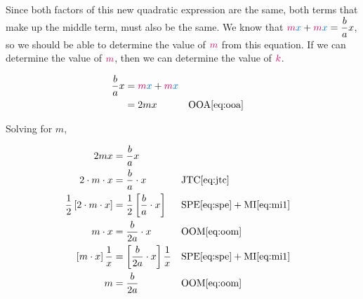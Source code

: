 Since both factors of this new quadratic expression are the same, both terms that make up the middle term,  must also be the same.  We know that ${\color{sthlmRed}m}{\color{sthlmBlue}x} + {\color{sthlmRed}m}{\color{sthlmBlue}x}=\dfrac{b}{a}x$, so we should be able to determine the value of ${\color{sthlmRed}m}$ from this equation.    If we can determine the value of ${\color{sthlmRed}m}$, then we can determine the value of  ${\color{sthlmRed}k}$.

\begin{align*}
\dfrac{b}{a}x 	& = \textcolor{sthlmRed}{m}\textcolor{sthlmBlue}{x} + \textcolor{sthlmRed}{m}\textcolor{sthlmBlue}{x}\\
		& = 2mx && \text{OOA} \eqref{eq:ooa} \\
\end{align*}

Solving for $m$,

\begin{align*}
2mx & = \dfrac{b}{a}x \\
2 \cdot m \cdot x &= \dfrac{b}{a} \cdot x  && \text{JTC} \eqref{eq:jtc} \\
\dfrac{1}{2} \left[2 \cdot m \cdot x \right] &= \dfrac{1}{2} \left[\dfrac{b}{a} \cdot x \right]  && \text{SPE} \eqref{eq:spe} + \text{MI} \eqref{eq:mi1} \\
m \cdot  x &= \dfrac{b}{2a} \cdot x  && \text{OOM} \eqref{eq:oom} \\
\left[m \cdot x \right]\dfrac{1}{x}  &= \left[\dfrac{b}{2a}  \cdot x\right] \dfrac{1}{x}  && \text{SPE} \eqref{eq:spe} + \text{MI} \eqref{eq:mi1} \\
m &= \dfrac{b}{2a}  && \text{OOM} \eqref{eq:oom} 
\end{align*}



